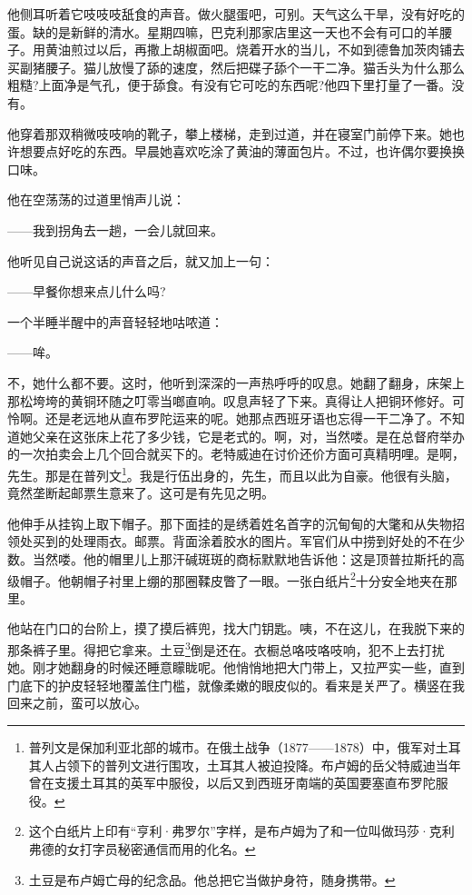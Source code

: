\par 他侧耳听着它吱吱吱舐食的声音。做火腿蛋吧，可别。天气这么干旱，没有好吃的蛋。缺的是新鲜的清水。星期四嘛，巴克利那家店里这一天也不会有可口的羊腰子。用黄油煎过以后，再撒上胡椒面吧。烧着开水的当儿，不如到德鲁加茨肉铺去买副猪腰子。猫儿放慢了舔的速度，然后把碟子舔个一干二净。猫舌头为什么那么粗糙?上面净是气孔，便于舔食。有没有它可吃的东西呢?他四下里打量了一番。没有。
\par 他穿着那双稍微吱吱响的靴子，攀上楼梯，走到过道，并在寝室门前停下来。她也许想要点好吃的东西。早晨她喜欢吃涂了黄油的薄面包片。不过，也许偶尔要换换口味。
\par 他在空荡荡的过道里悄声儿说：
\par ——我到拐角去一趟，一会儿就回来。
\par 他听见自己说这话的声音之后，就又加上一句：
\par ——早餐你想来点儿什么吗?
\par 一个半睡半醒中的声音轻轻地咕哝道：
\par ——哞。
\par 不，她什么都不要。这时，他听到深深的一声热呼呼的叹息。她翻了翻身，床架上那松垮垮的黄铜环随之叮零当啷直响。叹息声轻了下来。真得让人把铜环修好。可怜啊。还是老远地从直布罗陀运来的呢。她那点西班牙语也忘得一干二净了。不知道她父亲在这张床上花了多少钱，它是老式的。啊，对，当然喽。是在总督府举办的一次拍卖会上几个回合就买下的。老特威迪在讨价还价方面可真精明哩。是啊，先生。那是在普列文\footnote{普列文是保加利亚北部的城市。在俄土战争（1877——1878）中，俄军对土耳其人占领下的普列文进行围攻，土耳其人被迫投降。布卢姆的岳父特威迪当年曾在支援土耳其的英军中服役，以后又到西班牙南端的英国要塞直布罗陀服役。}。我是行伍出身的，先生，而且以此为自豪。他很有头脑，竟然垄断起邮票生意来了。这可是有先见之明。
\par 他伸手从挂钩上取下帽子。那下面挂的是绣着姓名首字的沉甸甸的大氅和从失物招领处买到的处理雨衣。邮票。背面涂着胶水的图片。军官们从中捞到好处的不在少数。当然喽。他的帽里儿上那汗碱斑斑的商标默默地告诉他：这是顶普拉斯托的高级帽子。他朝帽子衬里上绷的那圈鞣皮瞥了一眼。一张白纸片\footnote{这个白纸片上印有“亨利·弗罗尔”字样，是布卢姆为了和一位叫做玛莎·克利弗德的女打字员秘密通信而用的化名。}十分安全地夹在那里。
\par 他站在门口的台阶上，摸了摸后裤兜，找大门钥匙。咦，不在这儿，在我脱下来的那条裤子里。得把它拿来。土豆\footnote{土豆是布卢姆亡母的纪念品。他总把它当做护身符，随身携带。}倒是还在。衣橱总咯吱咯吱响，犯不上去打扰她。刚才她翻身的时候还睡意矇眬呢。他悄悄地把大门带上，又拉严实一些，直到门底下的护皮轻轻地覆盖住门槛，就像柔嫩的眼皮似的。看来是关严了。横竖在我回来之前，蛮可以放心。
